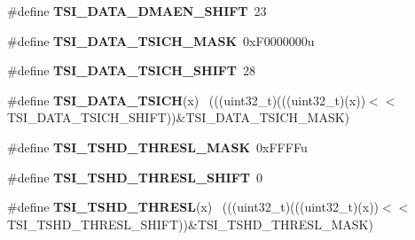 \begin{DoxyCompactItemize}
\item 
\hypertarget{group___t_s_i___register___masks_gab90f8f124f3b09590815173156ddc149}{}\#define {\bfseries T\+S\+I\+\_\+\+D\+A\+T\+A\+\_\+\+D\+M\+A\+E\+N\+\_\+\+S\+H\+I\+F\+T}~23\label{group___t_s_i___register___masks_gab90f8f124f3b09590815173156ddc149}

\item 
\hypertarget{group___t_s_i___register___masks_ga4e8ebbde2df6b54d7056eb509d23dcf6}{}\#define {\bfseries T\+S\+I\+\_\+\+D\+A\+T\+A\+\_\+\+T\+S\+I\+C\+H\+\_\+\+M\+A\+S\+K}~0x\+F0000000u\label{group___t_s_i___register___masks_ga4e8ebbde2df6b54d7056eb509d23dcf6}

\item 
\hypertarget{group___t_s_i___register___masks_ga93e49d0e44e5be77fbf39e45d5b9b9f0}{}\#define {\bfseries T\+S\+I\+\_\+\+D\+A\+T\+A\+\_\+\+T\+S\+I\+C\+H\+\_\+\+S\+H\+I\+F\+T}~28\label{group___t_s_i___register___masks_ga93e49d0e44e5be77fbf39e45d5b9b9f0}

\item 
\hypertarget{group___t_s_i___register___masks_gacbf53b5407b77996f7b19db499a4c198}{}\#define {\bfseries T\+S\+I\+\_\+\+D\+A\+T\+A\+\_\+\+T\+S\+I\+C\+H}(x)                                            ~(((uint32\+\_\+t)(((uint32\+\_\+t)(x))$<$$<$T\+S\+I\+\_\+\+D\+A\+T\+A\+\_\+\+T\+S\+I\+C\+H\+\_\+\+S\+H\+I\+F\+T))\&T\+S\+I\+\_\+\+D\+A\+T\+A\+\_\+\+T\+S\+I\+C\+H\+\_\+\+M\+A\+S\+K)\label{group___t_s_i___register___masks_gacbf53b5407b77996f7b19db499a4c198}

\item 
\hypertarget{group___t_s_i___register___masks_ga9b69d87b18f8791e9b8d97d67b3bc6d7}{}\#define {\bfseries T\+S\+I\+\_\+\+T\+S\+H\+D\+\_\+\+T\+H\+R\+E\+S\+L\+\_\+\+M\+A\+S\+K}~0x\+F\+F\+F\+Fu\label{group___t_s_i___register___masks_ga9b69d87b18f8791e9b8d97d67b3bc6d7}

\item 
\hypertarget{group___t_s_i___register___masks_ga18eac1ce2de17bfde158e5047b4a9e0e}{}\#define {\bfseries T\+S\+I\+\_\+\+T\+S\+H\+D\+\_\+\+T\+H\+R\+E\+S\+L\+\_\+\+S\+H\+I\+F\+T}~0\label{group___t_s_i___register___masks_ga18eac1ce2de17bfde158e5047b4a9e0e}

\item 
\hypertarget{group___t_s_i___register___masks_gaddcbde38b62a7d253e85fde507ba0be0}{}\#define {\bfseries T\+S\+I\+\_\+\+T\+S\+H\+D\+\_\+\+T\+H\+R\+E\+S\+L}(x)                                          ~(((uint32\+\_\+t)(((uint32\+\_\+t)(x))$<$$<$T\+S\+I\+\_\+\+T\+S\+H\+D\+\_\+\+T\+H\+R\+E\+S\+L\+\_\+\+S\+H\+I\+F\+T))\&T\+S\+I\+\_\+\+T\+S\+H\+D\+\_\+\+T\+H\+R\+E\+S\+L\+\_\+\+M\+A\+S\+K)\label{group___t_s_i___register___masks_gaddcbde38b62a7d253e85fde507ba0be0}


\end{DoxyCompactItemize}
